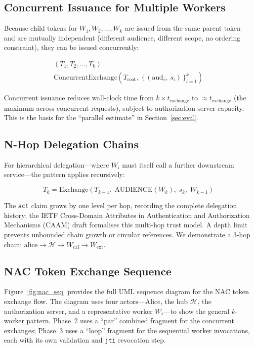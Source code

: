 \documentclass[journal]{IEEEtran}
\begin{document}
\subsection{Concurrent Issuance for Multiple Workers}

Because child tokens for $W_1, W_2, \ldots, W_k$ are issued from the same parent
token and are mutually independent (different audience, different scope, no
ordering constraint), they can be issued concurrently:

\begin{multline}
(T_1, T_2, \ldots, T_k) = \\
\mathrm{ConcurrentExchange}\!\left(
  T_{\mathrm{root}},\;
  \bigl\{\,(\mathrm{aud}_i,\; s_i)\,\bigr\}_{i=1}^{k}
\right)
\label{eq:concurrent}
\end{multline}

Concurrent issuance reduces wall-clock time from $k \times t_{\mathrm{exchange}}$
to $\approx t_{\mathrm{exchange}}$ (the maximum across concurrent requests),
subject to authorization server capacity. This is the basis for the
``parallel estimate'' in Section~\ref{sec:eval}.

\subsection{N-Hop Delegation Chains}

For hierarchical delegation---where $W_i$ must itself call a further downstream
service---the pattern applies recursively:

\begin{equation}
T_k = \mathrm{Exchange}(T_{k-1},\;
  \mathrm{AUDIENCE}(W_k),\; s_k,\; W_{k-1})
\label{eq:nhop}
\end{equation}

The \texttt{act} claim grows by one level per hop, recording the complete
delegation history; the IETF Cross-Domain Attributes in Authentication and
Authorization Mechanisms (CAAM) draft \cite{ietf_caam} formalises this
multi-hop trust model. A depth limit prevents unbounded chain growth or
circular references. We demonstrate a 3-hop chain:
$\text{alice} \to \mathcal{H} \to W_{\mathrm{cal}} \to W_{\mathrm{ext}}$.

\subsection{NAC Token Exchange Sequence}

Figure~\ref{fig:nac_seq} provides the full UML sequence diagram for the NAC
token exchange flow. The diagram uses four actors---Alice, the hub
$\mathcal{H}$, the authorization server, and a representative worker
$W_i$---to show the general $k$-worker pattern. Phase~2 uses a ``par''
combined fragment for the concurrent exchanges; Phase~3 uses a ``loop''
fragment for the sequential worker invocations, each with its own
validation and \texttt{jti} revocation step.
\end{document}
